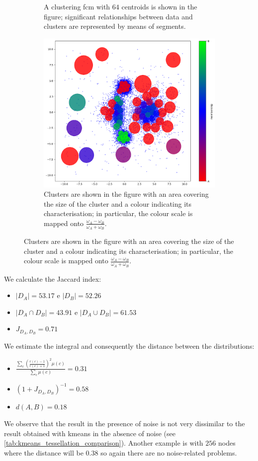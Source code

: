 \begin{figure}[H]
\begin{subfigure}{0.45\linewidth}
		\caption[Application of fcm distance - fcm application]{A clustering \gls{fcm} with $64$ centroids is shown in the figure; significant relationships between data and clusters are represented by means of segments.}
		\label{fig:fcm_2D_fcm}
	\end{subfigure}
	\begin{subfigure}{\linewidth}
		\includegraphics[width=\linewidth]{Figures/measure_2D_fcm.png}
		\caption[Application of fcm distance - discretisation]{Clusters are shown in the figure with an area covering the size of the cluster and a colour indicating its characterisation; in particular, the colour scale is mapped onto $\frac{\omega_A-\omega_B}{\omega_A+\omega_B}$.}
		\label{fig:measure_data_2D_fcm}
	\end{subfigure}
\end{figure}

\newpage
\noindent We calculate the Jaccard index:
\begin{itemize}
	\item $ |D_A| = 53.17 $ e $ |D_B| = 52.26 $
	\item $ |D_A\cap D_B| = 43.91 $ e $ |D_A \cup D_B| = 61.53 $
	\item $ J_{D_A,D_B} = 0.71 $
\end{itemize}
We estimate the integral and consequently the distance between the distributions:
\begin{itemize}
	\item $ \frac{\sum_c \left(\frac{r(c)-1}{r(c)+1}\right)^2 \mu(c)}{\sum_c \mu(c)} = 0.31 $
	\item $ (1 + J_{D_A, D_B})^{-1} = 0.58 $
	\item $ d(A,B) = 0.18 $
\end{itemize}
We observe that the result in the presence of noise is not very dissimilar to the result obtained with \gls{kmeans} in the absence of noise (see \cref{tab:kmeans_tessellation_comparison}). Another example is with $256$ nodes where the distance will be $0.38$ so again there are no noise-related problems.

